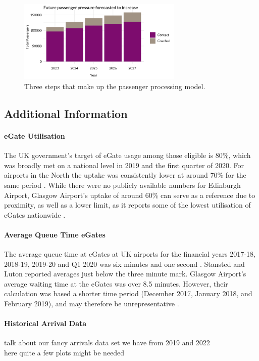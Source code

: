 \documentclass[10pt]{article}
\begin{document}
\begin{figure}[!ht]
    \centering
    \includegraphics[width=0.7\textwidth]{figures/future_passenger_burden_fig.png}
     \caption{Three steps that make up the passenger processing model.  } \label{fig:future_passenger_burden}
\end{figure}

\subsection{Additional Information}

\paragraph{eGate Utilisation}
The UK government's target of eGate usage among those eligible is 80\%, which was broadly met on a national level in 2019 and the first quarter of 2020. For airports in the North the uptake was consistently lower at around 70\% for the same period \cite{Inspection_eGates}. While there were no publicly available numbers for Edinburgh Airport, Glasgow Airport's uptake of around 60\% can serve as a reference due to proximity, as well as a lower limit, as it reports some of the lowest utilisation of eGates nationwide \cite{Inspection_eGates}. 

\paragraph{Average Queue Time eGates}
The average queue time at eGates at UK airports for the financial years 2017-18, 2018-19, 2019-20 and Q1 2020 was six minutes and one second \cite{Inspection_eGates}. Stansted and Luton reported averages just below the three minute mark. Glasgow Airport's average waiting time at the eGates was over 8.5 minutes. However, their calculation was based a shorter time period (December 2017, January 2018, and February 2019), and may therefore be unrepresentative \cite{Inspection_eGates}.


\paragraph{Historical Arrival Data}
talk about our fancy arrivals data set we have from 2019 and 2022 \\
here quite a few plots might be needed 
\end{document}
